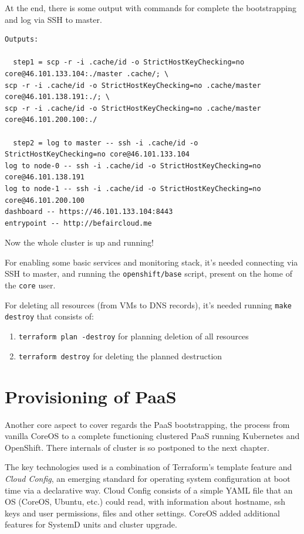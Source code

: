 At the end, there is some output with commands for complete the bootstrapping and log via SSH to master.

\begin{verbatim}
Outputs:

  step1 = scp -r -i .cache/id -o StrictHostKeyChecking=no core@46.101.133.104:./master .cache/; \
scp -r -i .cache/id -o StrictHostKeyChecking=no .cache/master core@46.101.138.191:./; \
scp -r -i .cache/id -o StrictHostKeyChecking=no .cache/master core@46.101.200.100:./

  step2 = log to master -- ssh -i .cache/id -o StrictHostKeyChecking=no core@46.101.133.104
log to node-0 -- ssh -i .cache/id -o StrictHostKeyChecking=no core@46.101.138.191
log to node-1 -- ssh -i .cache/id -o StrictHostKeyChecking=no core@46.101.200.100
dashboard -- https://46.101.133.104:8443
entrypoint -- http://befaircloud.me
\end{verbatim}

Now the whole cluster is up and running!

For enabling some basic services and monitoring stack, it's needed connecting via SSH to master, and running the \texttt{openshift/base} script, present on the home of the \texttt{core} user.

For deleting all resources (from VMs to DNS records), it's needed running \texttt{make destroy} that consists of:
\begin{enumerate}
\item \texttt{terraform plan -destroy} for planning deletion of all resources
\item \texttt{terraform destroy} for deleting the planned destruction
\end{enumerate}

\section{Provisioning of PaaS}\label{provisioning-of-paas}

Another core aspect to cover regards the PaaS bootstrapping, the process from vanilla CoreOS to a complete functioning clustered PaaS running Kubernetes and OpenShift.  There internals of cluster is so postponed to the next chapter.

The key technologies used is a combination of Terraform's template feature and \textit{Cloud Config}, an emerging standard for operating system configuration at boot time via a declarative way.  Cloud Config consists of a simple YAML file that an OS (CoreOS, Ubuntu, etc.) could read, with information about hostname, ssh keys and user permissions, files and other settings.  CoreOS added additional features for SystemD units and cluster upgrade.

